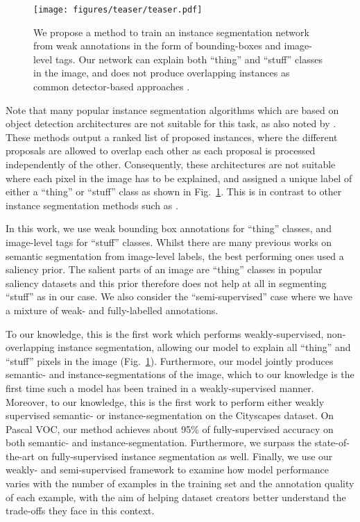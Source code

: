 \documentclass[runningheads]{llncs}
\begin{document}
\begin{figure}[t]
\centering

\texttt{[image: figures/teaser/teaser.pdf]}

\caption{We propose a method to train an instance segmentation network from weak annotations in the form of bounding-boxes and image-level tags. Our network can explain both ``thing'' and ``stuff'' classes in the image, and does not produce overlapping instances as common detector-based approaches \cite{he_iccv_2017,dai_cvpr_2016,li_cvpr_2017}.
}
\label{fig:teaser}
\end{figure} 
Note that many popular instance segmentation algorithms which are based on object detection architectures \cite{he_iccv_2017,dai_cvpr_2016,li_cvpr_2017,liu_arxiv_2018,liu_cvpr_2016} are not suitable for this task, as also noted by \cite{kirillov_arxiv_2018}.
These methods output a ranked list of proposed instances, where the different proposals are allowed to overlap each other as each proposal is processed independently of the other.
Consequently, these architectures are not suitable where each pixel in the image has to be explained, and assigned a unique label of either a ``thing'' or ``stuff'' class as shown in Fig.~\ref{fig:teaser}.
This is in contrast to other instance segmentation methods such as \cite{arnab_cvpr_2017,bai_cvpr_2017,brabandere_cvprw_2017,kirillov_cvpr_2017,liu_iccv_2017}.

In this work, we use weak bounding box annotations for ``thing'' classes, and image-level tags for ``stuff'' classes.
Whilst there are many previous works on semantic segmentation from image-level labels, the best performing ones \cite{wei_cvpr_2017,wei_pami_2017,oh_cvpr_2017,chaudhry_bmvc_2017} used a saliency prior.
The salient parts of an image are ``thing'' classes in popular saliency datasets \cite{cheng_pami_2015,yang_cvpr_2013,shi_pami_2016} and this prior therefore does not help at all in segmenting ``stuff'' as in our case.
We also consider the ``semi-supervised'' case where we have a mixture of weak- and fully-labelled annotations.

To our knowledge, this is the first work which performs weakly-supervised, non-overlapping instance segmentation, allowing our model to explain all ``thing'' and ``stuff'' pixels in the image (Fig.~\ref{fig:teaser}).
Furthermore, our model jointly produces semantic- and instance-segmentations of the image, which to our knowledge is the first time such a model has been trained in a weakly-supervised manner.
Moreover, to our knowledge, this is the first work to perform either weakly supervised semantic- or instance-segmentation on the Cityscapes dataset.
On Pascal VOC, our method achieves about 95\% of fully-supervised accuracy on both semantic- and instance-segmentation. 
Furthermore, we surpass the state-of-the-art on fully-supervised instance segmentation as well.
Finally, we use our weakly- and semi-supervised framework to examine how model performance varies with the number of examples in the training set and the annotation quality of each example, with the aim of helping dataset creators better understand the trade-offs they face in this context.
\end{document}
